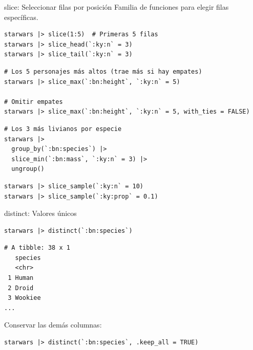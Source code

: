 \documentclass[8pt]{beamer}
\begin{document}
\begin{frame}[fragile]{slice: Seleccionar filas por posición}
	Familia de funciones para elegir filas específicas.
\begin{lstlisting}[style=RScript]
starwars |> slice(1:5)  # Primeras 5 filas
starwars |> slice_head(`:ky:n` = 3)
starwars |> slice_tail(`:ky:n` = 3)
\end{lstlisting}

\begin{lstlisting}[style=RScript]
# Los 5 personajes más altos (trae más si hay empates)
starwars |> slice_max(`:bn:height`, `:ky:n` = 5)

# Omitir empates
starwars |> slice_max(`:bn:height`, `:ky:n` = 5, with_ties = FALSE)
\end{lstlisting}

\begin{lstlisting}[style=RScript]
# Los 3 más livianos por especie
starwars |>
  group_by(`:bn:species`) |>
  slice_min(`:bn:mass`, `:ky:n` = 3) |>
  ungroup()
\end{lstlisting}

\begin{lstlisting}[style=RScript]
starwars |> slice_sample(`:ky:n` = 10)
starwars |> slice_sample(`:ky:prop` = 0.1)
\end{lstlisting}
\end{frame}






\begin{frame}[fragile]{distinct: Valores únicos}
\begin{lstlisting}[style=RScript]
starwars |> distinct(`:bn:species`)
\end{lstlisting}
\begin{lstlisting}[style=RConsole]
# A tibble: 38 x 1
   species
   <chr>
 1 Human
 2 Droid
 3 Wookiee
...
\end{lstlisting}

	Conservar las demás columnas:
\begin{lstlisting}[style=RScript]
starwars |> distinct(`:bn:species`, .keep_all = TRUE)
\end{lstlisting}
\end{frame}
\end{document}
